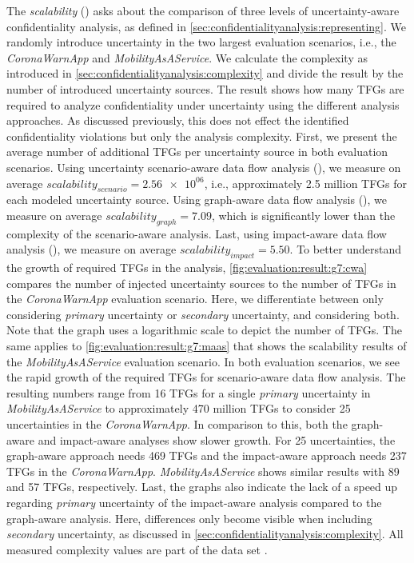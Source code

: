 The \emph{scalability} () asks about the comparison of three levels of uncertainty-aware confidentiality analysis, as defined in \autoref{sec:confidentialityanalysis:representing}.
We randomly introduce uncertainty in the two largest evaluation scenarios, i.e., the \emph{CoronaWarnApp} and \emph{MobilityAsAService}.
We calculate the complexity as introduced in \autoref{sec:confidentialityanalysis:complexity} and divide the result by the number of introduced uncertainty sources.
The result shows how many \acp{TFG} are required to analyze confidentiality under uncertainty using the different analysis approaches.
As discussed previously, this does not effect the identified confidentiality violations but only the analysis complexity.
First, we present the average number of additional \acp{TFG} per uncertainty source in both evaluation scenarios.
Using uncertainty scenario-aware data flow analysis (), we measure on average $scalability_{scenario} = \num{2.56e+06}$, i.e., approximately 2.5 million \acp{TFG} for each modeled uncertainty source.
Using graph-aware data flow analysis (), we measure on average $scalability_{graph} = 7.09$, which is significantly lower than the complexity of the scenario-aware analysis.
Last, using impact-aware data flow analysis (), we measure on average $scalability_{impact} = 5.50$.
To better understand the growth of required \acp{TFG} in the analysis, \autoref{fig:evaluation:result:g7:cwa} compares the number of injected uncertainty sources to the number of \acp{TFG} in the \emph{CoronaWarnApp} evaluation scenario.
Here, we differentiate between only considering \emph{primary} uncertainty or \emph{secondary} uncertainty, and considering both.
Note that the graph uses a logarithmic scale to depict the number of \acp{TFG}.
The same applies to \autoref{fig:evaluation:result:g7:maas} that shows the scalability results of the \emph{MobilityAsAService} evaluation scenario.
In both evaluation scenarios, we see the rapid growth of the required \acp{TFG} for scenario-aware data flow analysis.
The resulting numbers range from 16 \acp{TFG} for a single \emph{primary} uncertainty in \emph{MobilityAsAService} to approximately 470 million \acp{TFG} to consider 25 uncertainties in the \emph{CoronaWarnApp}.
In comparison to this, both the graph-aware and impact-aware analyses show slower growth.
For 25 uncertainties, the graph-aware approach needs 469 \acp{TFG} and the impact-aware approach needs 237 \acp{TFG} in the \emph{CoronaWarnApp}.
\emph{MobilityAsAService} shows similar results with 89 and 57 \acp{TFG}, respectively.
Last, the graphs also indicate the lack of a speed up regarding \emph{primary} uncertainty of the impact-aware analysis compared to the graph-aware analysis.
Here, differences only become visible when including \emph{secondary} uncertainty, as discussed in \autoref{sec:confidentialityanalysis:complexity}.
All measured complexity values are part of the data set \cite{dataset}.

